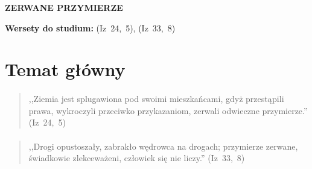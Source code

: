 \documentclass[10pt,a4paper,oneside]{article}
\begin{document}
\centerline{\textbf{\MakeUppercase{Zerwane przymierze}}}
\begin{center}
\textbf{Wersety do studium:} 
\mbox{(Iz 24, 5)}, \mbox{(Iz 33, 8)}
\end{center}
\section{Temat główny}
\paragraph{}
\begin{quote}
,,Ziemia jest splugawiona pod swoimi mieszkańcami, gdyż przestąpili prawa, wykroczyli przeciwko przykazaniom, zerwali odwieczne przymierze.'' \mbox{(Iz 24, 5)}
\end{quote}
\paragraph{}
\begin{quote}
,,Drogi opustoszały, zabrakło wędrowca na drogach; przymierze zerwane, świadkowie zlekceważeni, człowiek się nie liczy.'' \mbox{(Iz 33, 8)}
\end{quote}
\end{document}

